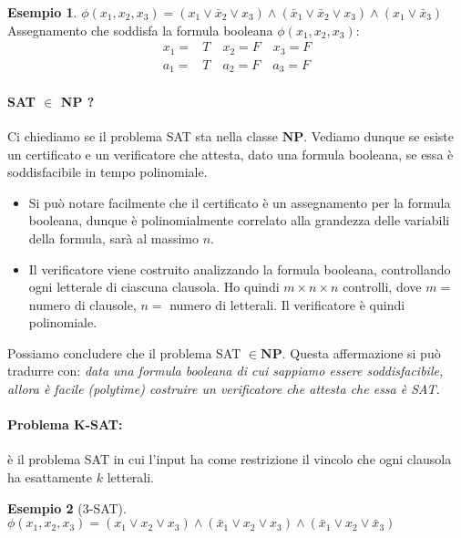 \documentclass[a4paper]{article}
\theoremstyle{definition}
\newtheorem{esempio}{Esempio}[subsection]
\newcommand{\np}{\mathbf{NP}}
\begin{document}
			\begin{esempio}
				$ \phi(x_1, x_2, x_3) = (x_1\vee \bar{x}_2\vee x_3)\wedge (\bar{x}_1\vee\bar{x}_2\vee x_3) \wedge (x_1\vee \bar{x}_3) $ \\
				Assegnamento che soddisfa la formula booleana $ \phi(x_1, x_2, x_3) $:
				\begin{align*}
					x_1 =& T\quad x_2 = F\quad x_3 = F \\
					a_1 =& T\quad a_2 = F\quad a_3 = F
				\end{align*}
			\end{esempio}
			
		\paragraph{SAT $ \in $ NP ?} Ci chiediamo se il problema SAT sta nella classe $ \np $. Vediamo dunque se esiste un certificato e un verificatore che attesta, dato una formula booleana, se essa è soddisfacibile in tempo polinomiale.
		\begin{itemize}
			\item Si può notare facilmente che il certificato è un assegnamento per la formula booleana, dunque è polinomialmente correlato alla grandezza delle variabili della formula, sarà al massimo $ n $.
			\item Il verificatore viene costruito analizzando la formula booleana, controllando ogni letterale di ciascuna clausola. Ho quindi $ m\times n \times n $ controlli, dove $ m = $ numero di clausole, $ n = $ numero di letterali. Il verificatore è quindi polinomiale.
		\end{itemize}
		Possiamo concludere che il problema SAT $ \in \np $. Questa affermazione si può tradurre con: \textit{data una formula booleana di cui sappiamo essere soddisfacibile, allora è facile (polytime) costruire un verificatore che attesta che essa è SAT.}
		
		\paragraph{Problema K-SAT:} è il problema SAT in cui l'input ha come restrizione il vincolo che ogni clausola ha esattamente $ k $ letterali.
		
		\begin{esempio}[3-SAT]
			$ \phi(x_1, x_2, x_3) = (x_1\vee x_2 \vee x_3)\wedge (\bar{x}_1\vee x_2 \vee x_3 ) \wedge (\bar{x}_1 \vee x_2\vee \bar{x}_3) $
		\end{esempio}
		  
\end{document}
